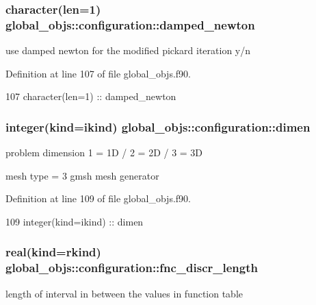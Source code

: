 \subsubsection[{damped\+\_\+newton}]{\setlength{\rightskip}{0pt plus 5cm}character(len=1) global\+\_\+objs\+::configuration\+::damped\+\_\+newton}\label{structglobal__objs_1_1configuration_a8cdc2fc2c78e2477d3aafaa27a86f33a}


use damped newton for the modified pickard iteration y/n 



Definition at line 107 of file global\+\_\+objs.\+f90.


\begin{DoxyCode}
107     \textcolor{keywordtype}{character(len=1)}    :: damped\_newton
\end{DoxyCode}
\subsubsection[{dimen}]{\setlength{\rightskip}{0pt plus 5cm}integer(kind=ikind) global\+\_\+objs\+::configuration\+::dimen}\label{structglobal__objs_1_1configuration_a44c08032d72af4a98d77a3f18048b7f7}


problem dimension 1 = 1D / 2 = 2D / 3 = 3D 

mesh type = 3 gmsh mesh generator 

Definition at line 109 of file global\+\_\+objs.\+f90.


\begin{DoxyCode}
109     \textcolor{keywordtype}{integer(kind=ikind)} :: dimen
\end{DoxyCode}
\subsubsection[{fnc\+\_\+discr\+\_\+length}]{\setlength{\rightskip}{0pt plus 5cm}real(kind=rkind) global\+\_\+objs\+::configuration\+::fnc\+\_\+discr\+\_\+length}\label{structglobal__objs_1_1configuration_a7600f645fd4d084557fc96366286e6de}


length of interval in between the values in function table 



